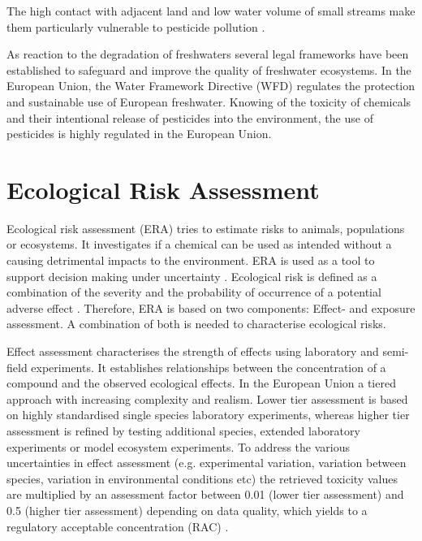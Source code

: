 The high contact with adjacent land and low water volume of small streams make them particularly vulnerable to pesticide pollution \citep{biggs_importance_2016, lorenz_specifics_2016}. 

As reaction to the degradation of freshwaters several legal frameworks have been established to safeguard and improve the quality of freshwater ecosystems. 
In the European Union, the Water Framework Directive (WFD) \citep{european_union_directive_2009} regulates the protection and sustainable use of European freshwater.
Knowing of the toxicity of chemicals and their intentional release of pesticides into the environment, the use of pesticides is highly regulated in the European Union. 



\section{Ecological Risk Assessment}

Ecological risk assessment (ERA) tries to estimate risks to animals, populations or ecosystems.
It investigates if a chemical can be used as intended without a causing detrimental impacts to the environment. 
ERA is used as a tool to support decision making under uncertainty \citep{newman_fundamentals_2015}. 
Ecological risk is defined as a combination of the severity and the probability of occurrence of a potential adverse effect \citep{suter_ecological_2007}. 
Therefore, ERA is based on two components: Effect- and exposure assessment.
A combination of both is needed to characterise ecological risks.

Effect assessment characterises the strength of effects using laboratory and semi-field experiments.
It establishes relationships between the concentration of a compound and the observed ecological effects.
In the European Union a tiered approach with increasing complexity and realism.
Lower tier assessment is based on highly standardised single species laboratory experiments, whereas higher tier assessment is refined by testing additional species, extended laboratory experiments or model ecosystem experiments. 
To address the various uncertainties in effect assessment (e.g. experimental variation, variation between species, variation in environmental conditions etc) the retrieved toxicity values are multiplied by an assessment factor between 0.01 (lower tier assessment) and 0.5 (higher tier assessment) depending on data quality, which yields to a regulatory acceptable concentration (RAC) \citep{efsa_guidance_2013}. 

